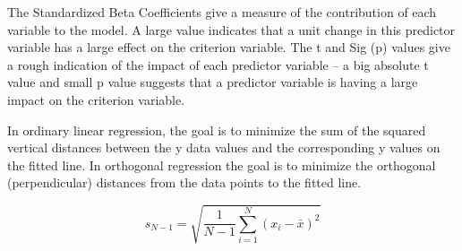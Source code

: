 The Standardized Beta Coefficients give a measure of the
contribution of each variable to the model. A large value indicates that a unit change in this predictor variable has a large effect on the criterion variable.
The t and Sig (p) values give a
rough indication of the impact of each predictor variable – a big
absolute t value and small p value suggests that a predictor variable
is having a large impact on the criterion variable.



\newpage

	In ordinary linear regression, the goal is to minimize the sum of
		the squared vertical distances between the y data values and the
		corresponding y values on the fitted line. In orthogonal
		regression the goal is to minimize the orthogonal (perpendicular)
		distances from the data points to the fitted line.
		
		
		
		
		\[ s_{N - 1} = \sqrt {\frac{1}{{N - 1}}\sum\limits_{i = 1}^N {\left( {x_i - \bar x} \right)^2 }
		} \]
		
		

%
%
%
